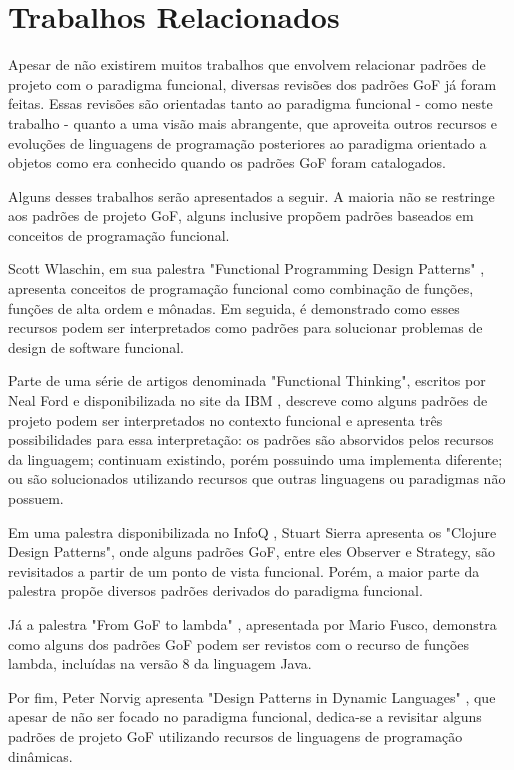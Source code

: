 \chapter{Trabalhos Relacionados}

Apesar de não existirem muitos trabalhos que envolvem
relacionar padrões de projeto com o paradigma funcional, 
diversas revisões dos padrões GoF já foram feitas.
\cite{nealford,peternorvig,scottwlaschin,stuartsierra,mariofusco} 
Essas revisões são orientadas tanto ao paradigma 
funcional - como neste trabalho - quanto a  
uma visão mais abrangente, que aproveita 
outros recursos e evoluções de linguagens de 
programação posteriores ao paradigma orientado a 
objetos como era 
conhecido quando os padrões GoF foram catalogados.

Alguns desses trabalhos serão apresentados a seguir.
A maioria não se restringe aos padrões de 
projeto GoF, alguns inclusive propõem padrões baseados 
em conceitos de programação funcional.

Scott Wlaschin, em sua palestra "Functional Programming 
Design Patterns" \cite{scottwlaschin}, apresenta conceitos de programação 
funcional como combinação de funções, funções de alta 
ordem e mônadas. Em seguida, é demonstrado como esses 
recursos podem ser 
interpretados como padrões para solucionar problemas 
de design de software funcional.

Parte de uma série de artigos denominada "Functional 
Thinking", escritos por Neal Ford e disponibilizada 
no site da IBM \cite{nealford}, descreve como alguns padrões de projeto 
podem ser interpretados no contexto funcional e 
apresenta três possibilidades para essa interpretação: 
os padrões são absorvidos pelos recursos da 
linguagem; continuam existindo, porém possuindo 
uma implementa diferente; ou são solucionados 
utilizando recursos que outras linguagens ou 
paradigmas não possuem.

Em uma palestra disponibilizada no InfoQ \cite{stuartsierra}, Stuart Sierra 
apresenta os "Clojure Design Patterns", onde alguns 
padrões GoF, entre eles Observer e Strategy, são 
revisitados a partir de um ponto de vista funcional. 
Porém, a maior parte da palestra propõe 
diversos padrões derivados do paradigma funcional.

Já a palestra "From GoF to lambda" \cite{mariofusco}, apresentada por 
Mario Fusco, demonstra como alguns dos padrões GoF 
podem ser revistos com o recurso de funções lambda, 
incluídas na versão 8 da linguagem Java.

Por fim, Peter Norvig apresenta "Design Patterns in 
Dynamic Languages" \cite{peternorvig}, que apesar de não ser focado 
no paradigma funcional, dedica-se a revisitar alguns 
padrões de projeto GoF utilizando recursos de linguagens 
de programação dinâmicas. 
